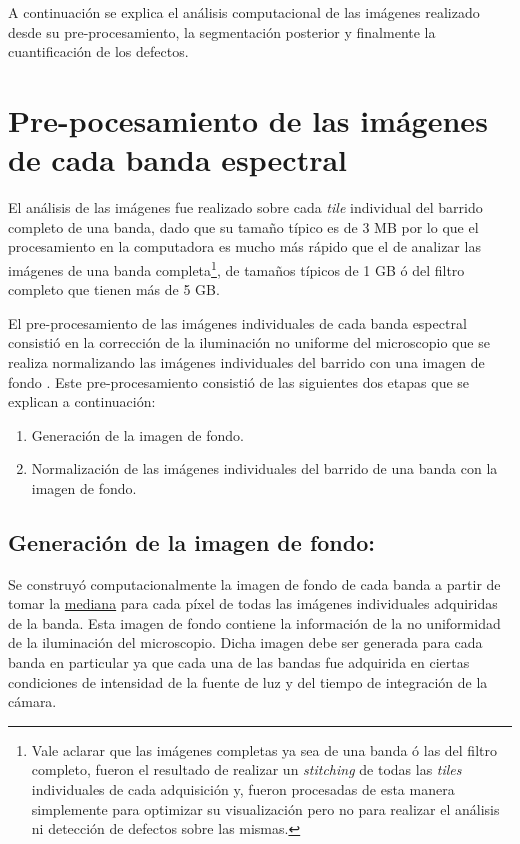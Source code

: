 A continuación se explica el análisis computacional de las imágenes realizado desde su pre-procesamiento, la segmentación posterior y finalmente la cuantificación de los defectos.

\singlespacing
\section{Pre-pocesamiento de las imágenes de cada banda espectral }

\hspace{0.5cm}El análisis de las imágenes fue realizado sobre cada \textit{tile} individual del barrido completo de una banda, dado que su tamaño típico es de 3 MB por lo que el procesamiento en la computadora es mucho más rápido que el de analizar las imágenes de una banda completa\footnote{Vale aclarar que las imágenes completas ya sea de una banda ó las del filtro completo, fueron el resultado de realizar un \textit{stitching} de todas las \textit{tiles} individuales de cada adquisición y, fueron procesadas de esta manera simplemente para optimizar su visualización pero no para realizar el análisis ni detección de defectos sobre las mismas.}, de tamaños típicos de 1 GB ó del filtro completo que tienen más de 5 GB.

El pre-procesamiento de las imágenes individuales de cada banda espectral consistió en la corrección de la iluminación no uniforme del microscopio que se realiza normalizando las imágenes individuales del barrido con una imagen de fondo \cite{Nordenfelt}. Este pre-procesamiento consistió de las siguientes dos etapas que se explican a continuación:
\begin{enumerate}
\justifying
\item Generación de la imagen de fondo.
\item Normalización de las imágenes individuales del barrido de una banda con la imagen de fondo.
\end{enumerate}

\singlespacing
\subsection{Generación de la imagen de fondo: \href{https://github.com/jrr1984/defects_analysis/blob/master/MAIN/bg.py}{\faGithub}}

\hspace{0.5cm}Se construyó computacionalmente la imagen de fondo de cada banda a partir de tomar la \underline{mediana} para cada píxel de todas las imágenes individuales adquiridas de la banda. Esta imagen de fondo contiene la información de la no uniformidad de la iluminación del microscopio. Dicha imagen debe ser generada para cada banda en particular ya que cada una de las bandas fue adquirida en ciertas condiciones de intensidad de la fuente de luz y del tiempo de integración de la cámara. 

